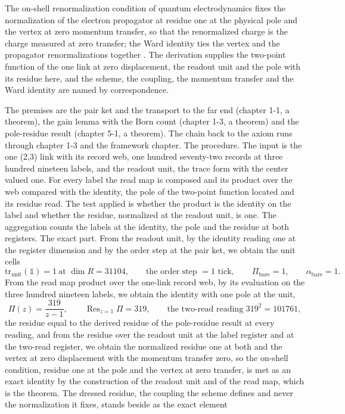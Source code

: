 \begin{chbridge}
The on-shell renormalization condition of quantum electrodynamics fixes the normalization of the electron propagator at residue one at the physical pole and the vertex at zero momentum transfer, so that the renormalized charge is the charge measured at zero transfer; the Ward identity ties the vertex and the propagator renormalizations together \cite{Ward1950,BjorkenDrell1965}. The derivation supplies the two-point function of the one link at zero displacement, the readout unit and the pole with its residue here, and the scheme, the coupling, the momentum transfer and the Ward identity are named by correspondence.
\end{chbridge}
\begin{chproof}
The premises are the pair ket and the transport to the far end (chapter 1-1, a theorem), the gain lemma with the Born count (chapter 1-3, a theorem) and the pole-residue result (chapter 5-1, a theorem). The chain back to the axiom runs through chapter 1-3 and the framework chapter. The procedure. The input is the one (2,3) link with its record web, one hundred seventy-two records at three hundred nineteen labels, and the readout unit, the trace form with the center valued one. For every label the read map is composed and its product over the web compared with the identity, the pole of the two-point function located and its residue read. The test applied is whether the product is the identity on the label and whether the residue, normalized at the readout unit, is one. The aggregation counts the labels at the identity, the pole and the residue at both registers. The exact part. From the readout unit, by the identity reading one at the register dimension and by the order step at the pair ket, we obtain the unit cells
\begin{equation}
\mathrm{tr}_{\text{unit}}(\mathbb{1}) = 1 \ \text{at } \dim R = 31104,\qquad \text{the order step } = 1 \text{ tick},\qquad \Pi_{\text{bare}} = 1,\qquad \alpha_{\text{bare}} = 1 .
\end{equation}
From the read map product over the one-link record web, by its evaluation on the three hundred nineteen labels, we obtain the identity with one pole at the unit,
\begin{equation}
\Pi(z) = \frac{319}{z-1},\qquad \operatorname{Res}_{z=1}\Pi = 319,\qquad \text{the two-read reading } 319^{2} = 101761 ,
\end{equation}
the residue equal to the derived residue of the pole-residue result at every reading, and from the residue over the readout unit at the label register and at the two-read register, we obtain the normalized residue one at both and the vertex at zero displacement with the momentum transfer zero, so the on-shell condition, residue one at the pole and the vertex at zero transfer, is met as an exact identity by the construction of the readout unit and of the read map, which is the theorem. The dressed residue, the coupling the scheme defines and never the normalization it fixes, stands beside as the exact element

\end{chproof}
